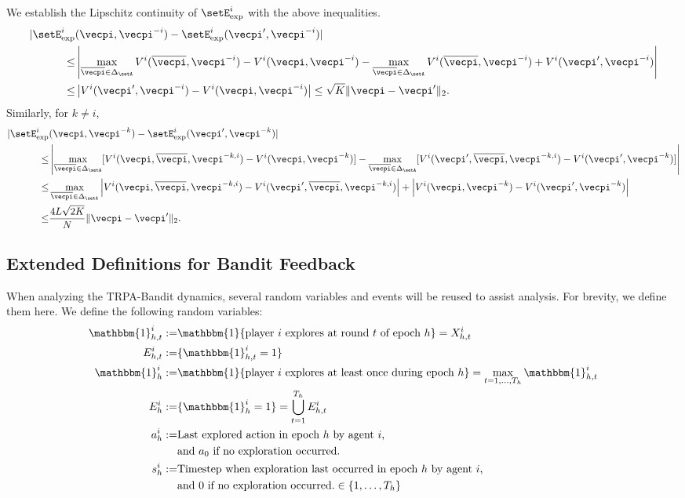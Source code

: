 We establish the Lipschitz continuity of $\setE^i_{\text{exp}}$ with the above inequalities.
\begin{align*}
    |\setE^i_{\text{exp}} &(\vecpi, \vecpi^{-i}) - \setE^i_{\text{exp}}(\vecpi', \vecpi^{-i}) | \\
    \leq & \left|\max_{\overline{\vecpi}\in \Delta_\setA} V^i(\overline{\vecpi}, \vecpi^{-i}) - V^i(\vecpi, \vecpi^{-i}) - \max_{\overline{\vecpi}\in \Delta_\setA} V^i(\overline{\vecpi}, \vecpi^{-i}) + V^i(\vecpi', \vecpi^{-i})\right| \\
    \leq & \left| V^i(\vecpi', \vecpi^{-i}) - V^i(\vecpi, \vecpi^{-i})\right| 
    \leq \sqrt{K} \|\vecpi - \vecpi'\|_2.
\end{align*}
Similarly, for $k\neq i$,
\begin{align*}
|\setE^i_{\text{exp}} &(\vecpi, \vecpi^{-k}) - \setE^i_{\text{exp}}(\vecpi', \vecpi^{-k}) | \\
    \leq & \left|\max_{\overline{\vecpi}\in \Delta_\setA} [ V^i( \vecpi, \overline{\vecpi},\vecpi^{-k,i}) - V^i(\vecpi, \vecpi^{-k}) ] - \max_{\overline{\vecpi}\in \Delta_\setA} [V^i( \vecpi', \overline{\vecpi},\vecpi^{-k,i}) - V^i(\vecpi', \vecpi^{-k}) ]\right| \\
    \leq & \max_{\overline{\vecpi}\in \Delta_\setA} \left| V^i( \vecpi, \overline{\vecpi},\vecpi^{-k,i}) - V^i( \vecpi',\overline{\vecpi}, \vecpi^{-k,i}) \right| + \left| V^i(\vecpi, \vecpi^{-k}) - V^i(\vecpi', \vecpi^{-k})\right| \\
    \leq & \frac{4L\sqrt{2K}}{N} \| \vecpi - \vecpi'\|_2.
\end{align*}

\subsection{Extended Definitions for Bandit Feedback}\label{sec:bandit_extended_defs}

When analyzing the TRPA-Bandit dynamics, several random variables and events will be reused to assist analysis.
For brevity, we define them here.
We define the following random variables:
\begin{align*}
    \mathbbm{1}_{h,t}^i := &\mathbbm{1}\{\text{player $i$ explores at round $t$ of epoch $h$}\} = X_{h,t}^i \\
    E_{h,t}^i := &\{\mathbbm{1}_{h,t}^i = 1 \} \\
    \mathbbm{1}_{h}^i := &\mathbbm{1}\{\text{player $i$ explores at least once during epoch $h$}\} = \max_{t = 1, \ldots, T_h} \mathbbm{1}_{h,t}^i  \\
    E_{h}^i := &\{\mathbbm{1}_{h}^i = 1 \} = \bigcup_{t=1}^{T_h} E_{h,t}^i\\
    a_{h}^i := &\text{Last explored action in epoch $h$ by agent $i$,} \\
        &\text{and $a_0$ if no exploration occurred}. \\
    s_h^i := &\text{Timestep when exploration last occurred in epoch $h$ by agent $i$, }\\
        &\text{and $0$ if no exploration occurred.} \in \{1, \ldots, T_h \}
\end{align*}

